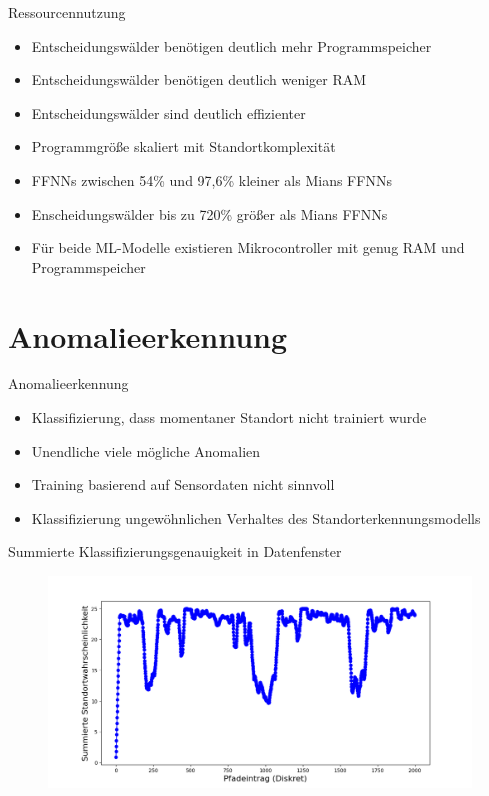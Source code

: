 \documentclass[10pt]{beamer}
\begin{document}
\begin{frame}{Ressourcennutzung}
    \begin{itemize}
        \item Entscheidungswälder benötigen deutlich mehr Programmspeicher
        \item Entscheidungswälder benötigen deutlich weniger RAM
        \item Entscheidungswälder sind deutlich effizienter
        \item Programmgröße skaliert mit Standortkomplexität
        \item FFNNs zwischen 54\% und 97,6\% kleiner als Mians FFNNs
        \item Enscheidungswälder bis zu 720\% größer als Mians FFNNs
        \item Für beide ML-Modelle existieren Mikrocontroller mit genug RAM und Programmspeicher
    \end{itemize}
\end{frame}

\section{Anomalieerkennung}
\begin{frame}{Anomalieerkennung}
    \begin{itemize}
        \item Klassifizierung, dass momentaner Standort nicht trainiert wurde
        \item Unendliche viele mögliche Anomalien
        \item Training basierend auf Sensordaten nicht sinnvoll
        \item Klassifizierung ungewöhnlichen Verhaltes des Standorterkennungsmodells
    \end{itemize}
\end{frame}

\begin{frame}{Summierte Klassifizierungsgenauigkeit in Datenfenster}
    \begin{figure}
        \centering
        \includegraphics[width=\linewidth]{anomaly_detection/window_conf.png}
    \end{figure}
\end{frame}
\end{document}
